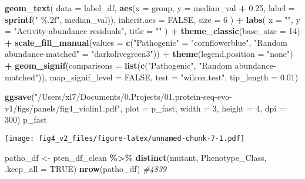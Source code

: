 \documentclass[
]{article}
\newenvironment{Shaded}{\begin{snugshade}}{\end{snugshade}}
\newcommand{\AttributeTok}[1]{\textcolor[rgb]{0.13,0.29,0.53}{#1}}
\newcommand{\CommentTok}[1]{\textcolor[rgb]{0.56,0.35,0.01}{\textit{#1}}}
\newcommand{\ConstantTok}[1]{\textcolor[rgb]{0.56,0.35,0.01}{#1}}
\newcommand{\DecValTok}[1]{\textcolor[rgb]{0.00,0.00,0.81}{#1}}
\newcommand{\FloatTok}[1]{\textcolor[rgb]{0.00,0.00,0.81}{#1}}
\newcommand{\FunctionTok}[1]{\textcolor[rgb]{0.13,0.29,0.53}{\textbf{#1}}}
\newcommand{\NormalTok}[1]{#1}
\newcommand{\OtherTok}[1]{\textcolor[rgb]{0.56,0.35,0.01}{#1}}
\newcommand{\SpecialCharTok}[1]{\textcolor[rgb]{0.81,0.36,0.00}{\textbf{#1}}}
\newcommand{\StringTok}[1]{\textcolor[rgb]{0.31,0.60,0.02}{#1}}
\begin{document}
\begin{Shaded}
\begin{Highlighting}[]
  \FunctionTok{geom\_text}\NormalTok{(}
    \AttributeTok{data =}\NormalTok{ label\_df,}
    \FunctionTok{aes}\NormalTok{(}\AttributeTok{x =}\NormalTok{ group, }\AttributeTok{y =}\NormalTok{ median\_val }\SpecialCharTok{+} \FloatTok{0.25}\NormalTok{, }\AttributeTok{label =} \FunctionTok{sprintf}\NormalTok{(}\StringTok{" \%.2f"}\NormalTok{, median\_val)),}
    \AttributeTok{inherit.aes =} \ConstantTok{FALSE}\NormalTok{,}
    \AttributeTok{size =} \DecValTok{6}
\NormalTok{  ) }\SpecialCharTok{+}
  \FunctionTok{labs}\NormalTok{(}
    \AttributeTok{x =} \StringTok{""}\NormalTok{,}
    \AttributeTok{y =} \StringTok{"Activity{-}abundance residuals"}\NormalTok{,}
    \AttributeTok{title =} \StringTok{""}
\NormalTok{  ) }\SpecialCharTok{+}
  \FunctionTok{theme\_classic}\NormalTok{(}\AttributeTok{base\_size =} \DecValTok{14}\NormalTok{) }\SpecialCharTok{+}
  \FunctionTok{scale\_fill\_manual}\NormalTok{(}\AttributeTok{values =} \FunctionTok{c}\NormalTok{(}\StringTok{"Pathogenic"} \OtherTok{=} \StringTok{"cornflowerblue"}\NormalTok{, }\StringTok{"Random abundance{-}matched"} \OtherTok{=} \StringTok{"darkolivegreen3"}\NormalTok{)) }\SpecialCharTok{+}
  \FunctionTok{theme}\NormalTok{(}\AttributeTok{legend.position =} \StringTok{"none"}\NormalTok{) }\SpecialCharTok{+}
  \FunctionTok{geom\_signif}\NormalTok{(}\AttributeTok{comparisons =} \FunctionTok{list}\NormalTok{(}\FunctionTok{c}\NormalTok{(}\StringTok{"Pathogenic"}\NormalTok{, }\StringTok{"Random abundance{-}matched"}\NormalTok{)),}
              \AttributeTok{map\_signif\_level =} \ConstantTok{FALSE}\NormalTok{,}
              \AttributeTok{test =} \StringTok{"wilcox.test"}\NormalTok{,}
              \AttributeTok{tip\_length =} \FloatTok{0.01}\NormalTok{)}

\FunctionTok{ggsave}\NormalTok{(}\StringTok{"/Users/xl7/Documents/0.Projects/01.protein{-}seq{-}evo{-}v1/figs/panels/fig4\_violin1.pdf"}\NormalTok{, }
       \AttributeTok{plot =}\NormalTok{ p\_fast, }\AttributeTok{width =} \DecValTok{3}\NormalTok{, }\AttributeTok{height =} \DecValTok{4}\NormalTok{, }\AttributeTok{dpi =} \DecValTok{300}\NormalTok{)}
\NormalTok{p\_fast}
\end{Highlighting}
\end{Shaded}

\texttt{[image: fig4\_v2\_files/figure-latex/unnamed-chunk-7-1.pdf]}

\begin{Shaded}
\begin{Highlighting}[]
\NormalTok{patho\_df }\OtherTok{\textless{}{-}}\NormalTok{ pten\_df\_clean }\SpecialCharTok{\%\textgreater{}\%} \FunctionTok{distinct}\NormalTok{(mutant, Phenotype\_Class, }\AttributeTok{.keep\_all =} \ConstantTok{TRUE}\NormalTok{)}
\FunctionTok{nrow}\NormalTok{(patho\_df) }\CommentTok{\#4839}
\end{Highlighting}
\end{Shaded}
\end{document}
